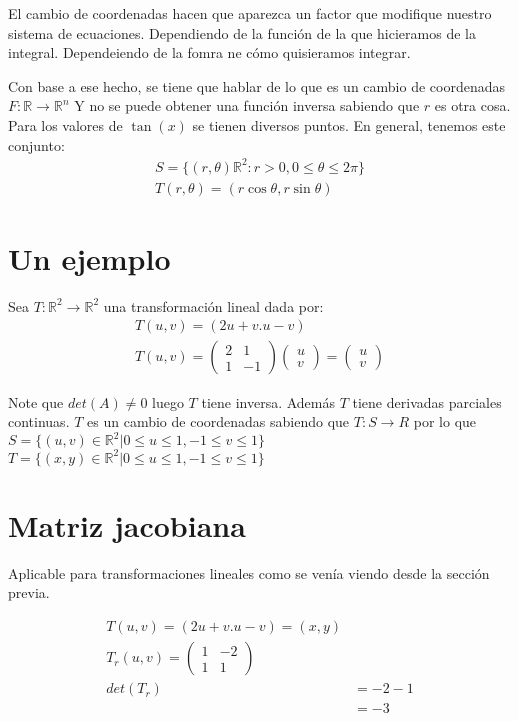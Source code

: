 \documentclass{article}
\newcommand{\field}[1]{\mathbb{#1}}
\newcommand{\R}{\field{R}}
\begin{document}
El cambio de coordenadas hacen que aparezca un factor que modifique nuestro
sistema de ecuaciones. Dependiendo de la función de la que hicieramos de la
integral. Dependeiendo de la fomra ne cómo quisieramos integrar.

Con base a ese hecho, se tiene que hablar de lo que es un cambio de coordenadas
$  F: \R \longrightarrow \R^{n} $ Y no se puede obtener una función inversa
sabiendo que $ r $ es otra cosa. Para los valores de $\tan(x)$ se tienen
diversos puntos. En general, tenemos este conjunto:
\begin{align}
  S = \{(r, \theta)\R^2: r>0, 0 \leq \theta \leq 2 \pi\} \\
  T(r, \theta) = (r\cos{\theta}, r\sin{\theta})
\end{align}

\section*{Un ejemplo}

Sea $ T: \R^2 \longrightarrow \R^2 $ una transformación lineal dada por:
\begin{align}
  T(u, v) = (2u+v. u-v) \\
  T(u, v) = \left( \begin{matrix}
    2 & 1 \\
    1 & -1
  \end{matrix} \right)
  \left( \begin{matrix}
    u\\
    v
  \end{matrix} \right) = \left( \begin{matrix}
    u \\
    v
  \end{matrix} \right)
\end{align}

Note que $ det(A)\neq0$ luego $T$ tiene inversa. Además $T$ tiene derivadas
parciales continuas. $T$ es un cambio de coordenadas sabiendo que
$ T:S \longrightarrow R $ por lo que
$ S = \{(u, v) \in \R^2 | 0 \leq u \leq 1, -1 \leq v \leq 1\}$
$ T = \{(x, y) \in \R^2 | 0 \leq u \leq 1, -1 \leq v \leq 1\}$

\section*{Matriz jacobiana}
Aplicable para transformaciones lineales como se venía viendo desde la sección
previa.

\begin{align}
  T(u, v) = (2u+v. u-v)  =  (x, y) \\
  T_r(u, v) = \left( \begin{matrix}
    1 & -2 \\
    1 & 1
  \end{matrix} \right) \\
  det(T_r) &= -2 -1 \\
  &= -3 \\
\end{align}
\end{document}
